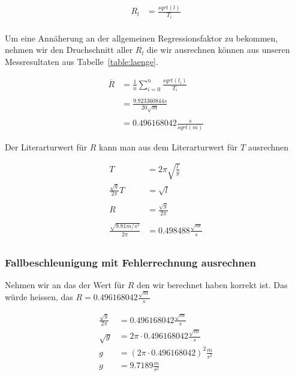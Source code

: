 \documentclass[12pt, a4paper, twoside]{article}
\begin{document}
\begin{align*}
  R_l & = \frac{sqrt(l)}{T_l} \\
\end{align*}

Um eine Annäherung an der allgemeinen Regressionsfaktor zu bekommen,
nehmen wir den Druchschnitt aller $R_l$ die wir ausrechnen können aus unseren Messresultaten aus Tabelle~\ref{table:laenge}.

\begin{align*}
  \overline{R} & = \frac{1}{n}\sum_{i=0}^{n} \frac{sqrt(l_i)}{T_i} \\
  \\
               & = \frac{9.923360844s}{20\sqrt{m}}                 \\
  \\
               & = 0.496168042\frac{s}{sqrt(m)}
\end{align*}

Der Literarturwert für $R$ kann man aus dem Literarturwert für $T$ ausrechnen

\begin{align*}
  T                             & = 2\pi \sqrt{\frac{l}{g}}    \\
  \frac{\sqrt{g}}{2\pi}T        & = \sqrt{l}                   \\
  \\
  R                             & = \frac{\sqrt{g}}{2\pi}      \\
  \\
  \frac{\sqrt{9.81m/s^2}}{2\pi} & = 0.498488\frac{\sqrt{m}}{s} \\
\end{align*}

\subsubsection{Fallbeschleunigung mit Fehlerrechnung ausrechnen}
Nehmen wir an das der Wert für $R$ den wir berechnet haben korrekt ist.
Das würde heissen, das $R = 0.496168042\frac{\sqrt{m}}{s}$

\begin{align*}
  \frac{\sqrt{g}}{2\pi} & = 0.496168042\frac{\sqrt{m}}{s}           \\
  \sqrt{g}              & = 2\pi\cdot 0.496168042\frac{\sqrt{m}}{s} \\
  g                     & = (2\pi\cdot0.496168042)^2\frac{m}{s^2}   \\
  g                     & = 9.7189\frac{m}{s^2}                     \\
\end{align*}
\end{document}
